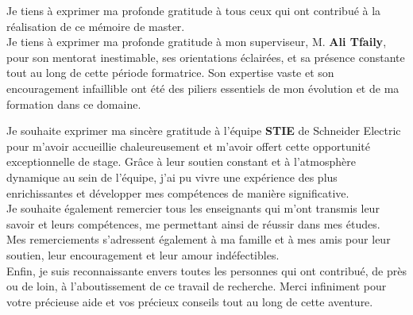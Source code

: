 

Je tiens à exprimer ma profonde gratitude à tous ceux qui ont contribué à la
réalisation de ce mémoire de master.\\


Je tiens à exprimer ma profonde gratitude à mon superviseur, M. \textbf{
Ali Tfaily}, pour son mentorat inestimable, ses orientations éclairées, et sa
présence constante tout au long de cette période formatrice. Son expertise
vaste et son encouragement infaillible ont été des piliers essentiels de mon
évolution et de ma formation dans ce domaine.

Je souhaite exprimer ma sincère gratitude à l'équipe \textbf{STIE} de Schneider
Electric pour m'avoir accueillie chaleureusement et m'avoir offert cette
opportunité exceptionnelle de stage. Grâce à leur soutien constant et à
l'atmosphère dynamique au sein de l'équipe, j'ai pu vivre une expérience des
plus enrichissantes et développer mes compétences de manière significative.\\

Je souhaite également remercier tous les enseignants qui m'ont transmis leur
savoir et leurs compétences, me permettant ainsi de réussir dans mes études.\\


Mes remerciements s'adressent également à ma famille et à mes amis pour leur
soutien, leur encouragement et leur amour indéfectibles.\\

Enfin, je suis reconnaissante envers toutes les personnes qui ont contribué, de
près ou de loin, à l'aboutissement de ce travail de recherche. Merci infiniment
pour votre précieuse aide et vos précieux conseils tout au long de cette
aventure.

\clearpage